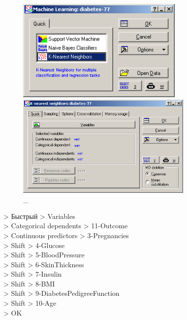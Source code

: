 \begin{figure}[!h]
  \centering

  \begin{minipage}{0.49\textwidth}
    \centering

    \includegraphics[height=5cm]
    {inc/v5_2.PNG}

    \caption{\_}

    \label{fig:2}
  \end{minipage}
  \begin{minipage}{0.49\textwidth}
    \centering

    \includegraphics[height=5cm]
    {inc/v5_3.PNG}

    \caption{\_}

    \label{fig:3}
  \end{minipage}
\end{figure}


> Быстрый > Variables \\
> Categorical dependents > 11-Outcome \\
> Continuous predictors > 3-Pregnancies \\
> Shift > 4-Glucose \\
> Shift > 5-BloodPressure \\
> Shift > 6-SkinThickness \\
> Shift > 7-Insulin \\
> Shift > 8-BMI \\
> Shift > 9-DiabetesPedigreeFunction \\
> Shift > 10-Age \\
> OK

